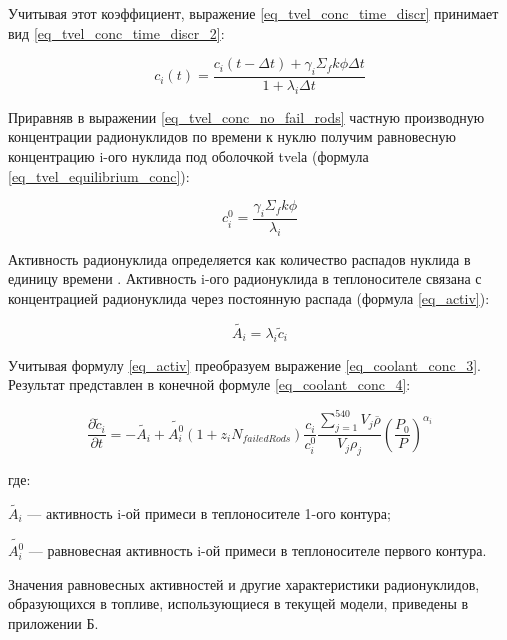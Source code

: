 Учитывая этот коэффициент, выражение \ref{eq_tvel_conc_time_discr} принимает вид \ref{eq_tvel_conc_time_discr_2}:

\begin{equation}
    \label{eq_tvel_conc_time_discr_2}
    c_{i}(t) = \frac{c_{i}(t - \Delta t) + \gamma_{i} \Sigma_{f} k \phi \Delta t}{1 + \lambda_{i} \Delta t}
\end{equation}

Приравняв в выражении \ref{eq_tvel_conc_no_fail_rods} частную производную концентрации радионуклидов по времени к 
нуклю получим равновесную концентрацию i-ого нуклида под оболочкой \ac{tvel}а (формула \ref{eq_tvel_equilibrium_conc}):

\begin{equation}
    \label{eq_tvel_equilibrium_conc}
    c_{i}^{0} = \frac{\gamma_{i} \Sigma_{f} k \phi}{\lambda_{i}} 
\end{equation}

Активность радионуклида определяется как количество распадов нуклида в единицу времени \cite{gusev_def}. Активность 
i-ого радионуклида в теплоносителе связана с концентрацией радионуклида через постоянную распада (формула 
\ref{eq_activ}):

\begin{equation}
    \label{eq_activ}
    \widetilde{A_{i}} = \lambda_{i} \widetilde{c}_{i}
\end{equation}

Учитывая формулу \ref{eq_activ} преобразуем выражение \ref{eq_coolant_conc_3}. Результат представлен в конечной формуле 
\ref{eq_coolant_conc_4}:

\begin{equation}
    \label{eq_coolant_conc_4}
    \frac{\partial \widetilde{c}_{i}}{\partial t} = -\widetilde{A_{i}} + \widetilde{A_{i}^{0}}
        (1 + z_{i}N_{failedRods})\frac{c_{i}}{c_{i}^{0}}\frac{\sum_{j=1}^{540} V_{j}\overline{\rho}}{V_{j}\rho_{j}}
        (\frac{P_{0}}{P})^{\alpha_{i}}
\end{equation}

где:
\begin{description}
    \item $\widetilde{A_{i}}$ --- активность i-ой примеси в теплоносителе 1-ого контура;
    \item $\widetilde{A_{i}^{0}}$ --- равновесная активность i-ой примеси в теплоносителе первого контура.
\end{description}

Значения равновесных активностей и другие характеристики радионуклидов, образующихся в топливе, использующиеся в 
текущей модели, приведены в приложении Б.

